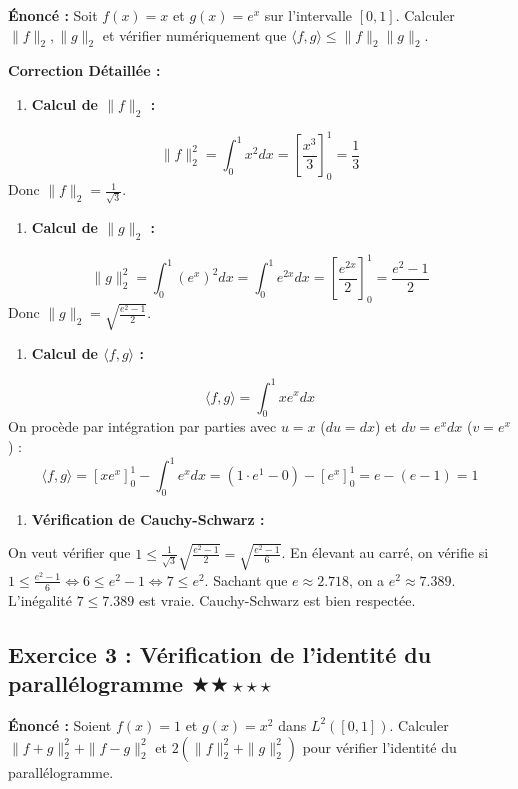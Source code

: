 \documentclass[11pt,a4paper]{article}
\begin{document}
\textbf{Énoncé :}
Soit $f(x) = x$ et $g(x) = e^x$ sur l'intervalle $[0, 1]$. Calculer $\|f\|_2, \|g\|_2$ et vérifier numériquement que $\langle f, g \rangle \le \|f\|_2 \|g\|_2$.

\textbf{Correction Détaillée :}
\begin{enumerate}
\item \textbf{Calcul de $\|f\|_2$ :}
\end{enumerate}
   $$ \|f\|_2^2 = \int_0^1 x^2 dx = \left[ \frac{x^3}{3} \right]_0^1 = \frac{1}{3} $$
   Donc $\|f\|_2 = \frac{1}{\sqrt{3}}$.
\begin{enumerate}
\item \textbf{Calcul de $\|g\|_2$ :}
\end{enumerate}
   $$ \|g\|_2^2 = \int_0^1 (e^x)^2 dx = \int_0^1 e^{2x} dx = \left[ \frac{e^{2x}}{2} \right]_0^1 = \frac{e^2 - 1}{2} $$
   Donc $\|g\|_2 = \sqrt{\frac{e^2 - 1}{2}}$.
\begin{enumerate}
\item \textbf{Calcul de $\langle f, g \rangle$ :}
\end{enumerate}
   $$ \langle f, g \rangle = \int_0^1 x e^x dx $$
   On procède par intégration par parties avec $u = x$ ($du = dx$) et $dv = e^x dx$ ($v = e^x$) :
   $$ \langle f, g \rangle = \left[ x e^x \right]_0^1 - \int_0^1 e^x dx = (1\cdot e^1 - 0) - \left[ e^x \right]_0^1 = e - (e - 1) = 1 $$
\begin{enumerate}
\item \textbf{Vérification de Cauchy-Schwarz :}
\end{enumerate}
   On veut vérifier que $1 \le \frac{1}{\sqrt{3}} \sqrt{\frac{e^2 - 1}{2}} = \sqrt{\frac{e^2 - 1}{6}}$.
   En élevant au carré, on vérifie si $1 \le \frac{e^2 - 1}{6} \iff 6 \le e^2 - 1 \iff 7 \le e^2$.
   Sachant que $e \approx 2.718$, on a $e^2 \approx 7.389$. L'inégalité $7 \le 7.389$ est vraie. Cauchy-Schwarz est bien respectée.



\subsection*{Exercice 3 : Vérification de l'identité du parallélogramme \quad $\bigstar\bigstar\star\star\star$}

\textbf{Énoncé :}
Soient $f(x) = 1$ et $g(x) = x^2$ dans $L^2([0,1])$. Calculer $\|f+g\|_2^2 + \|f-g\|_2^2$ et $2(\|f\|_2^2 + \|g\|_2^2)$ pour vérifier l'identité du parallélogramme.
\end{document}
